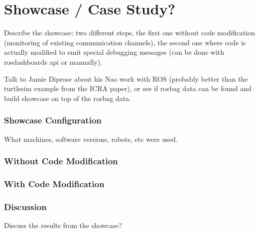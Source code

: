 \chapter{Showcase / Case Study?}
Describe the showcase: two different steps, the first one without code modification (monitoring of existing communication channels), the second one where code is actually modified to emit special debugging messages (can be done with rosdashboards api or manually).

Talk to Jamie Diprose about his Nao work with ROS (probably better than the turtlesim example from the ICRA paper), or see if rosbag data can be found and build showcase on top of the rosbag data.

\subsection{Showcase Configuration}
What machines, software versions, robots, etc were used.

\subsection{Without Code Modification}
\subsection{With Code Modification}

\subsection{Discussion}
Discuss the results from the showcase?
